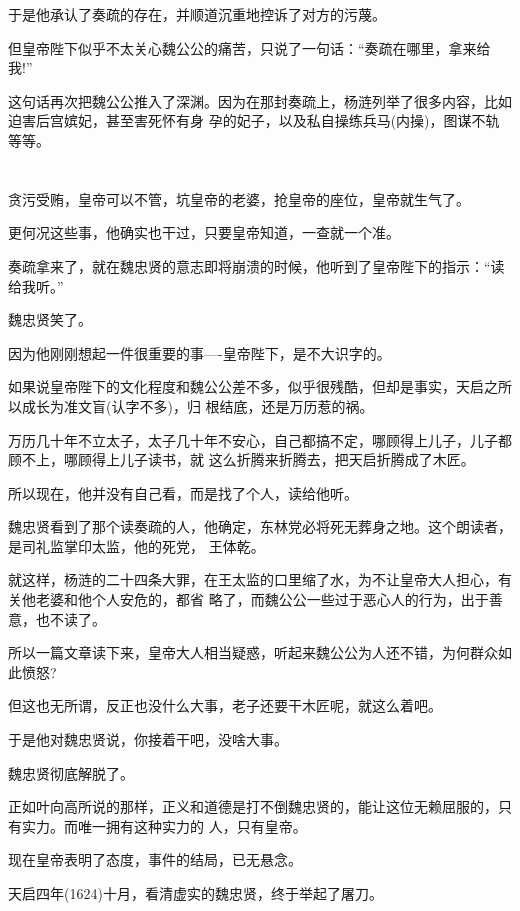 \documentclass[11pt,a4paper,onecolumn]{article}
\begin{document}
于是他承认了奏疏的存在，并顺道沉重地控诉了对方的污蔑。

但皇帝陛下似乎不太关心魏公公的痛苦，只说了一句话：``奏疏在哪里，拿来给我!''

这句话再次把魏公公推入了深渊。因为在那封奏疏上，杨涟列举了很多内容，比如迫害后宫嫔妃，甚至害死怀有身
孕的妃子，以及私自操练兵马(内操)，图谋不轨等等。

\section[\thesection]{}

贪污受贿，皇帝可以不管，坑皇帝的老婆，抢皇帝的座位，皇帝就生气了。

更何况这些事，他确实也干过，只要皇帝知道，一查就一个准。

奏疏拿来了，就在魏忠贤的意志即将崩溃的时候，他听到了皇帝陛下的指示：``读给我听。''

魏忠贤笑了。

因为他刚刚想起一件很重要的事----皇帝陛下，是不大识字的。

如果说皇帝陛下的文化程度和魏公公差不多，似乎很残酷，但却是事实，天启之所以成长为准文盲(认字不多)，归
根结底，还是万历惹的祸。

万历几十年不立太子，太子几十年不安心，自己都搞不定，哪顾得上儿子，儿子都顾不上，哪顾得上儿子读书，就
这么折腾来折腾去，把天启折腾成了木匠。

所以现在，他并没有自己看，而是找了个人，读给他听。

魏忠贤看到了那个读奏疏的人，他确定，东林党必将死无葬身之地。这个朗读者，是司礼监掌印太监，他的死党，
王体乾。

就这样，杨涟的二十四条大罪，在王太监的口里缩了水，为不让皇帝大人担心，有关他老婆和他个人安危的，都省
略了，而魏公公一些过于恶心人的行为，出于善意，也不读了。

所以一篇文章读下来，皇帝大人相当疑惑，听起来魏公公为人还不错，为何群众如此愤怒?

但这也无所谓，反正也没什么大事，老子还要干木匠呢，就这么着吧。

于是他对魏忠贤说，你接着干吧，没啥大事。

魏忠贤彻底解脱了。

正如叶向高所说的那样，正义和道德是打不倒魏忠贤的，能让这位无赖屈服的，只有实力。而唯一拥有这种实力的
人，只有皇帝。

现在皇帝表明了态度，事件的结局，已无悬念。

天启四年(1624)十月，看清虚实的魏忠贤，终于举起了屠刀。
\end{document}
